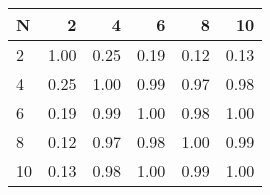 \begin{tabular}{lrrrrr}
\toprule
N &    2  &    4  &    6  &    8  &    10 \\
\midrule
2  &  1.00 &  0.25 &  0.19 &  0.12 &  0.13 \\
4  &  0.25 &  1.00 &  0.99 &  0.97 &  0.98 \\
6  &  0.19 &  0.99 &  1.00 &  0.98 &  1.00 \\
8  &  0.12 &  0.97 &  0.98 &  1.00 &  0.99 \\
10 &  0.13 &  0.98 &  1.00 &  0.99 &  1.00 \\
\bottomrule
\end{tabular}
